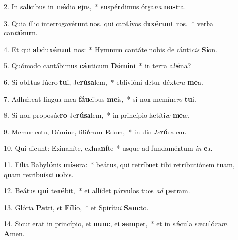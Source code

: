 2. In salícibus in \textbf{mé}dio \textbf{e}jus,~*  suspéndimus órga\textit{na} \textbf{nos}tra.\

3. Quia illic interrogavérunt nos, qui cap\textbf{tí}vos du\textbf{xé}\textbf{runt} nos,~*  verba can\textit{ti}\textbf{ó}num.\

4. Et qui \textbf{ab}du\textbf{xé}\textbf{runt} nos:~*  Hymnum cantáte nobis de cánti\textit{cis} \textbf{Si}on.\

5. Quómodo cantábimus \textbf{cán}ticum \textbf{Dó}\textbf{mi}ni~*  in terra a\textit{li}\textbf{é}na?\

6. Si oblítus fúero \textbf{tu}i, Je\textbf{rú}\textbf{sa}lem,~*  oblivióni detur déxte\textit{ra} \textbf{me}a.\

7. Adhǽreat lingua mea \textbf{fáu}cibus \textbf{me}is,~*  si non memíne\textit{ro} \textbf{tu}i.\

8. Si non proposúe\textbf{ro} Je\textbf{rú}\textbf{sa}lem,~*  in princípio lætíti\textit{æ} \textbf{me}æ.\

9. Memor esto, Dómine, fili\textbf{ó}rum \textbf{E}dom,~*  in die \textit{Je}\textbf{rú}salem.\

10. Qui dicunt: Exinaníte, ex\textbf{i}na\textbf{ní}te~*  usque ad fundaméntum \textit{in} \textbf{e}a.\

11. Fília Baby\textbf{ló}nis \textbf{mí}\textbf{se}ra:~*  beátus, qui retríbuet tibi retributiónem tuam, quam retribuís\textit{ti} \textbf{no}bis.\

12. Beátus \textbf{qui} te\textbf{né}bit,~*  et allídet párvulos tuos \textit{ad} \textbf{pe}tram.\

13. Glória \textbf{Pa}tri, et \textbf{Fí}\textbf{li}o,~*  et Spirítu\textit{i} \textbf{Sanc}to.\

14. Sicut erat in princípio, et \textbf{nunc}, et \textbf{sem}per,~*  et in sǽcula sæculó\textit{rum}. \textbf{A}men.\

